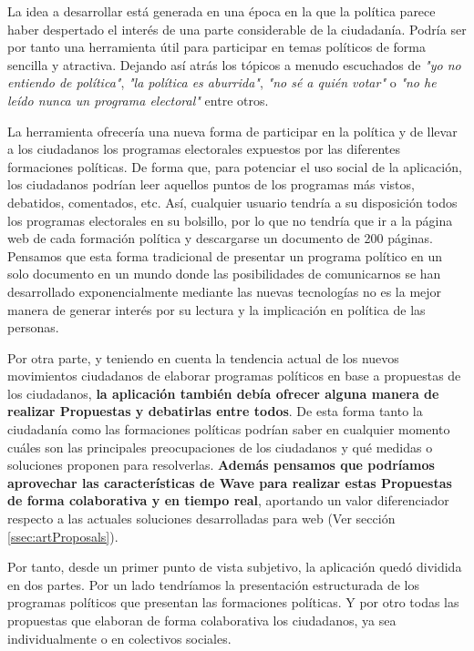 La idea a desarrollar está generada en una época en la que la política parece haber despertado el interés de una parte considerable de la ciudadanía. Podría ser por tanto una herramienta útil para participar en temas políticos de forma sencilla y atractiva. Dejando así atrás los tópicos a menudo escuchados de \textit{"yo no entiendo de política"}, \textit{"la política es aburrida"}, \textit{"no sé a quién votar"} o \textit{"no he leído nunca un programa electoral"} entre otros.

La herramienta ofrecería una nueva forma de participar en la política y de llevar a los ciudadanos los programas electorales expuestos por las diferentes formaciones políticas. De forma que, para potenciar el uso social de la aplicación, los ciudadanos podrían leer aquellos puntos de los programas más vistos, debatidos, comentados, etc. Así, cualquier usuario tendría a su disposición todos los programas electorales en su bolsillo, por lo que no tendría que ir a la página web de cada formación política y descargarse un documento de 200 páginas. Pensamos que esta forma tradicional de presentar un programa político en un solo documento en un mundo donde las posibilidades de comunicarnos se han desarrollado exponencialmente mediante las nuevas tecnologías no es la mejor manera de generar interés por su lectura y la implicación en política de las personas.

Por otra parte, y teniendo en cuenta la tendencia actual de los nuevos movimientos ciudadanos de elaborar programas políticos en base a propuestas de los ciudadanos, \textbf{la aplicación también debía ofrecer alguna manera de realizar Propuestas y debatirlas entre todos}. De esta forma tanto la ciudadanía como las formaciones políticas podrían saber en cualquier momento cuáles son las principales preocupaciones de los ciudadanos y qué medidas o soluciones proponen para resolverlas. \textbf{Además pensamos que podríamos aprovechar las características de Wave para realizar estas Propuestas de forma colaborativa y en tiempo real}, aportando un valor diferenciador respecto a las actuales soluciones desarrolladas para web (Ver sección \ref{ssec:artProposals}).

Por tanto, desde un primer punto de vista subjetivo, la aplicación quedó dividida en dos partes. Por un lado tendríamos la presentación estructurada de los programas políticos que presentan las formaciones políticas. Y por otro todas las propuestas que elaboran de forma colaborativa los ciudadanos, ya sea individualmente o en colectivos sociales.



